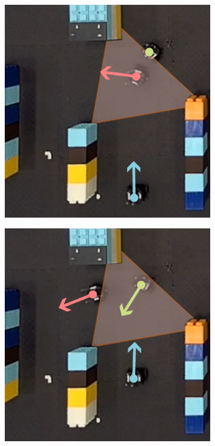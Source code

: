 \documentclass[letterpaper, 10 pt, conference]{ieeeconf}  %
\begin{document}
\begin{figure}[t]
\begin{subfigure}[b]{.25\linewidth}
         \caption{}
         \label{fig:expS2}
     \end{subfigure}
     \begin{subfigure}[b]{.25\linewidth}
         \centering
         \includegraphics[width=\linewidth]{experiment/s_Page_3.pdf}
         \caption{}
         \label{fig:expS3}
     \end{subfigure}
     \begin{subfigure}[b]{.25\linewidth}
         \centering
         \includegraphics[width=\linewidth]{experiment/s_Page_4.pdf}

\end{subfigure}
\end{figure}
\end{document}
